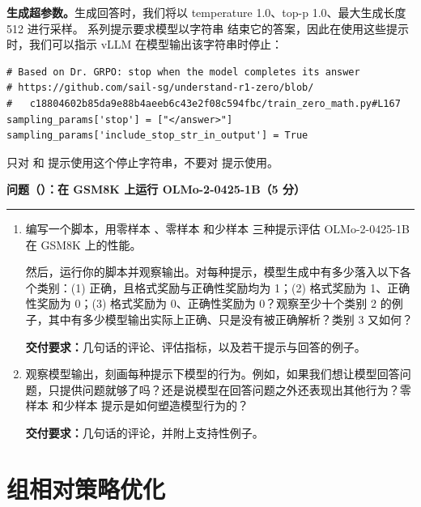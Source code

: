 \noindent\textbf{生成超参数。}生成回答时，我们将以 temperature 1.0、top-p 1.0、最大生成长度 512 进行采样。 系列提示要求模型以字符串  结束它的答案，因此在使用这些提示时，我们可以指示 vLLM 在模型输出该字符串时停止：

\begin{lstlisting}
# Based on Dr. GRPO: stop when the model completes its answer
# https://github.com/sail-sg/understand-r1-zero/blob/
#   c18804602b85da9e88b4aeeb6c43e2f08c594fbc/train_zero_math.py#L167
sampling_params['stop'] = ["</answer>"]
sampling_params['include_stop_str_in_output'] = True
\end{lstlisting}

只对  和  提示使用这个停止字符串，不要对  提示使用。

\medskip
\noindent\textbf{问题（）：在 GSM8K 上运行 OLMo-2-0425-1B（5 分）}
\par\nobreak\smallskip\hrule\nobreak\medskip

\begin{enumerate}[label=(\alph*)]
  \item 编写一个脚本，用零样本 、零样本  和少样本  三种提示评估 OLMo-2-0425-1B 在 GSM8K 上的性能。

  然后，运行你的脚本并观察输出。对每种提示，模型生成中有多少落入以下各个类别：(1) 正确，且格式奖励与正确性奖励均为 1；(2) 格式奖励为 1、正确性奖励为 0；(3) 格式奖励为 0、正确性奖励为 0？观察至少十个类别 2 的例子，其中有多少模型输出实际上正确、只是没有被正确解析？类别 3 又如何？

  \textbf{交付要求：}几句话的评论、评估指标，以及若干提示与回答的例子。

  \item 观察模型输出，刻画每种提示下模型的行为。例如，如果我们想让模型回答问题，只提供问题就够了吗？还是说模型在回答问题之外还表现出其他行为？零样本  和少样本  提示是如何塑造模型行为的？

  \textbf{交付要求：}几句话的评论，并附上支持性例子。
\end{enumerate}

\section{组相对策略优化}

